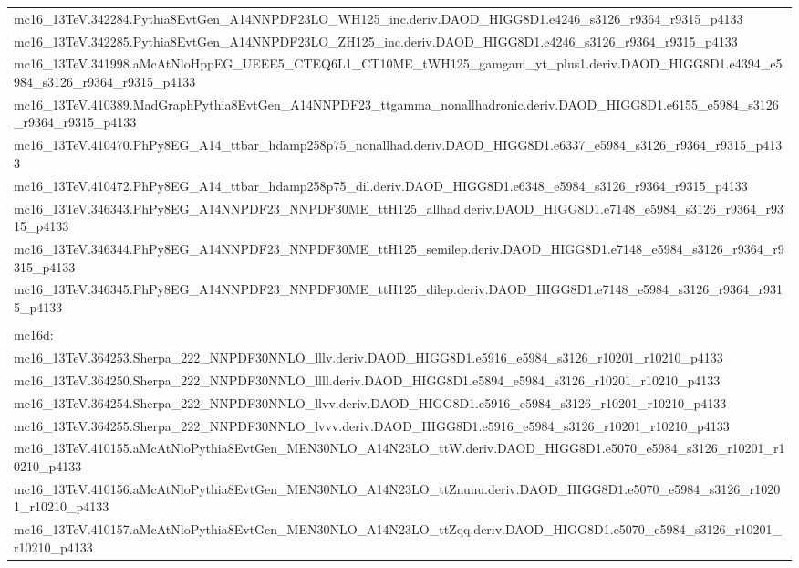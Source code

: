 \begin{adjustwidth}{-3em}{-3em}
\begin{longtable}{l}
mc16\_13TeV.342284.Pythia8EvtGen\_A14NNPDF23LO\_WH125\_inc.deriv.DAOD\_HIGG8D1.e4246\_s3126\_r9364\_r9315\_p4133 \\
mc16\_13TeV.342285.Pythia8EvtGen\_A14NNPDF23LO\_ZH125\_inc.deriv.DAOD\_HIGG8D1.e4246\_s3126\_r9364\_r9315\_p4133 \\
mc16\_13TeV.341998.aMcAtNloHppEG\_UEEE5\_CTEQ6L1\_CT10ME\_tWH125\_gamgam\_yt\_plus1.deriv.DAOD\_HIGG8D1.e4394\_e5984\_s3126\_r9364\_r9315\_p4133 \\
mc16\_13TeV.410389.MadGraphPythia8EvtGen\_A14NNPDF23\_ttgamma\_nonallhadronic.deriv.DAOD\_HIGG8D1.e6155\_e5984\_s3126\_r9364\_r9315\_p4133 \\
mc16\_13TeV.410470.PhPy8EG\_A14\_ttbar\_hdamp258p75\_nonallhad.deriv.DAOD\_HIGG8D1.e6337\_e5984\_s3126\_r9364\_r9315\_p4133 \\
mc16\_13TeV.410472.PhPy8EG\_A14\_ttbar\_hdamp258p75\_dil.deriv.DAOD\_HIGG8D1.e6348\_e5984\_s3126\_r9364\_r9315\_p4133 \\
mc16\_13TeV.346343.PhPy8EG\_A14NNPDF23\_NNPDF30ME\_ttH125\_allhad.deriv.DAOD\_HIGG8D1.e7148\_e5984\_s3126\_r9364\_r9315\_p4133 \\
mc16\_13TeV.346344.PhPy8EG\_A14NNPDF23\_NNPDF30ME\_ttH125\_semilep.deriv.DAOD\_HIGG8D1.e7148\_e5984\_s3126\_r9364\_r9315\_p4133 \\
mc16\_13TeV.346345.PhPy8EG\_A14NNPDF23\_NNPDF30ME\_ttH125\_dilep.deriv.DAOD\_HIGG8D1.e7148\_e5984\_s3126\_r9364\_r9315\_p4133 \\
 \\
mc16d: \\
mc16\_13TeV.364253.Sherpa\_222\_NNPDF30NNLO\_lllv.deriv.DAOD\_HIGG8D1.e5916\_e5984\_s3126\_r10201\_r10210\_p4133 \\
mc16\_13TeV.364250.Sherpa\_222\_NNPDF30NNLO\_llll.deriv.DAOD\_HIGG8D1.e5894\_e5984\_s3126\_r10201\_r10210\_p4133 \\
mc16\_13TeV.364254.Sherpa\_222\_NNPDF30NNLO\_llvv.deriv.DAOD\_HIGG8D1.e5916\_e5984\_s3126\_r10201\_r10210\_p4133 \\
mc16\_13TeV.364255.Sherpa\_222\_NNPDF30NNLO\_lvvv.deriv.DAOD\_HIGG8D1.e5916\_e5984\_s3126\_r10201\_r10210\_p4133 \\
mc16\_13TeV.410155.aMcAtNloPythia8EvtGen\_MEN30NLO\_A14N23LO\_ttW.deriv.DAOD\_HIGG8D1.e5070\_e5984\_s3126\_r10201\_r10210\_p4133 \\
mc16\_13TeV.410156.aMcAtNloPythia8EvtGen\_MEN30NLO\_A14N23LO\_ttZnunu.deriv.DAOD\_HIGG8D1.e5070\_e5984\_s3126\_r10201\_r10210\_p4133 \\
mc16\_13TeV.410157.aMcAtNloPythia8EvtGen\_MEN30NLO\_A14N23LO\_ttZqq.deriv.DAOD\_HIGG8D1.e5070\_e5984\_s3126\_r10201\_r10210\_p4133 \\

\end{longtable}
\end{adjustwidth}
